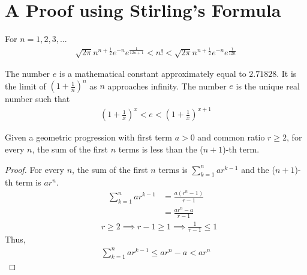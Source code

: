 \section{A Proof using Stirling's Formula}
\begin{lemma}\label{Stirling}
 For $n=1,2,3,...$
\begin{align}
    \nonumber \sqrt{2\pi}n^{n+\frac{1}{2}}e^{-n}e^{\frac{1}{12n+1}}< n! < \sqrt{2\pi}n^{n+\frac{1}{2}}e^{-n}e^{\frac{1}{12n}} 
\end{align}
\end{lemma}
\begin{definition}\label{e}
The number $e$ is a mathematical constant approximately equal to $2.71828$. It is the limit of $(1+\frac{1}{n})^n$ as $n$ approaches infinity. The number $e$ is the unique real number such that
\begin{align}
    \nonumber (1+\frac{1}{x})^{x} < e <(1+\frac{1}{x})^{x+1}
\end{align}
\end{definition}
\begin{lemma}\label{gp}
Given a geometric progression with first term $a> 0$ and common ratio $r \ge 2$, for every $n$, the sum of the first $n$ terms is less than the ($n+1$)-th term.
\end{lemma}
\begin{proof}
For every $n$, the sum of the first $n$ terms is $\sum_{k=1}^{n}ar^{k-1}$ and the ($n+1$)-th term is $ar^{n}$.
\begin{align}
    \nonumber \sum_{k=1}^{n}ar^{k-1}&=\frac{a(r^{n}-1)}{r-1}\\
    \nonumber &=\frac{ar^{n}-a}{r-1}
\end{align}
\begin{align}
    \nonumber &r\ge 2 \implies r-1 \ge 1 \implies \frac{1}{r-1} \le 1
\end{align}
Thus, 
\begin{align}
    \nonumber \sum_{k=1}^{n}ar^{k-1}\le ar^{n}-a < ar^{n}
\end{align} 
\end{proof}


